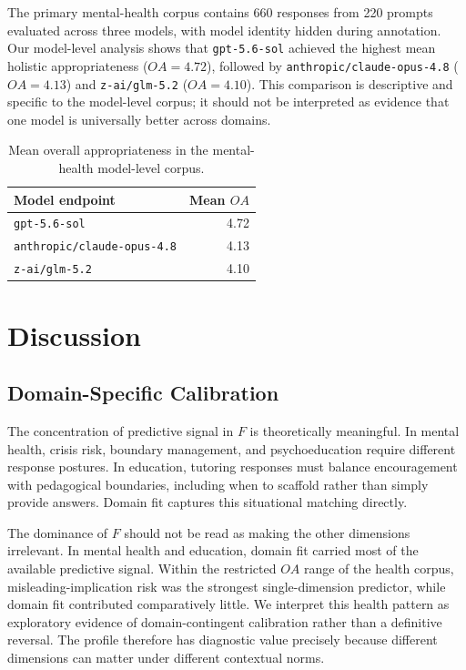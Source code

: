 \documentclass[manuscript,review,anonymous]{acmart}
\begin{document}
The primary mental-health corpus contains 660 responses from 220 prompts evaluated across three models, with model identity hidden during annotation. Our model-level analysis shows that \texttt{gpt-5.6-sol} achieved the highest mean holistic appropriateness ($OA=4.72$), followed by \texttt{anthropic/claude-opus-4.8} ($OA=4.13$) and \texttt{z-ai/glm-5.2} ($OA=4.10$). This comparison is descriptive and specific to the model-level corpus; it should not be interpreted as evidence that one model is universally better across domains.

\begin{table}[t]
\centering
\small
\caption{Mean overall appropriateness in the mental-health model-level corpus.}
\label{tab:model-oa}
\begin{tabular}{lr}
\toprule
Model endpoint & Mean $OA$ \\
\midrule
\texttt{gpt-5.6-sol} & 4.72 \\
\texttt{anthropic/claude-opus-4.8} & 4.13 \\
\texttt{z-ai/glm-5.2} & 4.10 \\
\bottomrule
\end{tabular}
\end{table}

\section{Discussion}

\subsection{Domain-Specific Calibration}

The concentration of predictive signal in $F$ is theoretically meaningful. In mental health, crisis risk, boundary management, and psychoeducation require different response postures. In education, tutoring responses must balance encouragement with pedagogical boundaries, including when to scaffold rather than simply provide answers. Domain fit captures this situational matching directly.

The dominance of $F$ should not be read as making the other dimensions irrelevant. In mental health and education, domain fit carried most of the available predictive signal. Within the restricted $OA$ range of the health corpus, misleading-implication risk was the strongest single-dimension predictor, while domain fit contributed comparatively little. We interpret this health pattern as exploratory evidence of domain-contingent calibration rather than a definitive reversal. The profile therefore has diagnostic value precisely because different dimensions can matter under different contextual norms.
\end{document}
